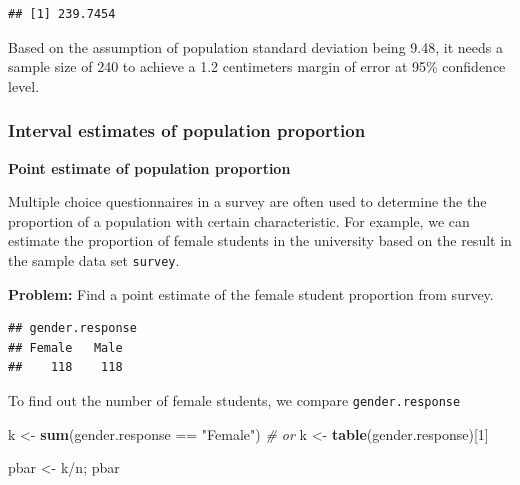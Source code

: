\documentclass[]{article}
\newenvironment{Shaded}{\begin{snugshade}}{\end{snugshade}}
\newcommand{\KeywordTok}[1]{\textcolor[rgb]{0.13,0.29,0.53}{\textbf{{#1}}}}
\newcommand{\DecValTok}[1]{\textcolor[rgb]{0.00,0.00,0.81}{{#1}}}
\newcommand{\StringTok}[1]{\textcolor[rgb]{0.31,0.60,0.02}{{#1}}}
\newcommand{\CommentTok}[1]{\textcolor[rgb]{0.56,0.35,0.01}{\textit{{#1}}}}
\newcommand{\NormalTok}[1]{{#1}}
\numberwithin{equation}{section}
\begin{document}
\begin{verbatim}
## [1] 239.7454
\end{verbatim}

Based on the assumption of population standard deviation being 9.48, it
needs a sample size of 240 to achieve a 1.2 centimeters margin of error
at 95\% confidence level.

\subsubsection{Interval estimates of population
proportion}\label{interval-estimates-of-population-proportion}

\textbf{Point estimate of population proportion}

Multiple choice questionnaires in a survey are often used to determine
the the proportion of a population with certain characteristic. For
example, we can estimate the proportion of female students in the
university based on the result in the sample data set \texttt{survey}.

\textbf{Problem:} Find a point estimate of the female student proportion
from survey.

\begin{Shaded}
\end{Shaded}

\begin{verbatim}
## gender.response
## Female   Male 
##    118    118
\end{verbatim}

To find out the number of female students, we compare
\texttt{gender.response}

\begin{Shaded}
\begin{Highlighting}[]
\NormalTok{k <-}\StringTok{ }\KeywordTok{sum}\NormalTok{(gender.response ==}\StringTok{ "Female"}\NormalTok{) }
\CommentTok{# or }
\NormalTok{k <-}\StringTok{ }\KeywordTok{table}\NormalTok{(gender.response)[}\DecValTok{1}\NormalTok{]}

\NormalTok{pbar <-}\StringTok{ }\NormalTok{k/n; pbar}
\end{Highlighting}
\end{Shaded}
\end{document}

